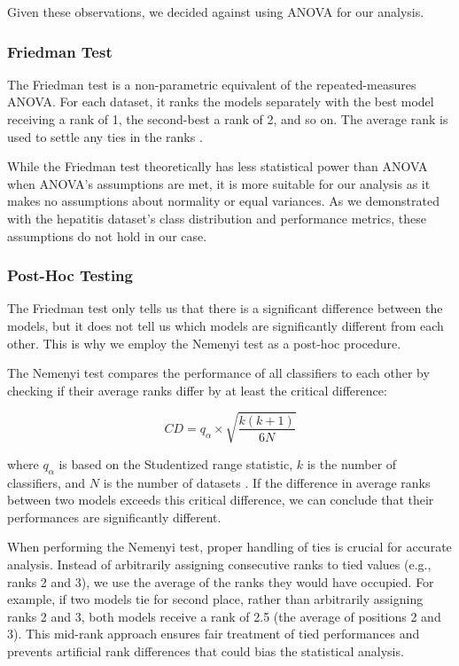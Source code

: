 Given these observations, we decided against using ANOVA for our analysis.

\subsubsection{Friedman Test}
The Friedman test is a non-parametric equivalent of the repeated-measures ANOVA. 
For each dataset, it ranks the models separately with the best model receiving a rank of 1, the second-best a rank of 2, and so on.
The average rank is used to settle any ties in the ranks \cite{Friedman_anova,Friedman_posthoc}.

While the Friedman test theoretically has less statistical power than ANOVA when ANOVA's assumptions are met,
it is more suitable for our analysis as it makes no assumptions about normality or equal variances.
As we demonstrated with the hepatitis dataset's class distribution and performance metrics, these assumptions do not hold in our case.

\subsubsection{Post-Hoc Testing}
The Friedman test only tells us that there is a significant difference between the models,
but it does not tell us which models are significantly different from each other.
This is why we employ the Nemenyi test as a post-hoc procedure.

The Nemenyi test compares the performance of all classifiers to each
other by checking if their average ranks differ by at least the critical difference:

\begin{equation}
    CD = q_{\alpha} \times \sqrt{\frac{k(k+1)}{6N}}
\end{equation}

where $q_{\alpha}$ is based on the Studentized range statistic, $k$ is the number of classifiers, and $N$ is
the number of datasets \cite{Friedman_posthoc}.
If the difference in average ranks between two models exceeds this critical difference, we can conclude that their performances are significantly different.

When performing the Nemenyi test, proper handling of ties is crucial for accurate analysis.
Instead of arbitrarily assigning consecutive ranks to tied values (e.g., ranks 2 and 3), we use the
average of the ranks they would have occupied. For example, if two models tie for second place,
rather than arbitrarily assigning ranks 2 and 3, both models receive a rank of 2.5 (the average of positions 2 and 3).
This mid-rank approach ensures fair treatment of tied performances and prevents artificial rank differences that could bias the statistical analysis.

